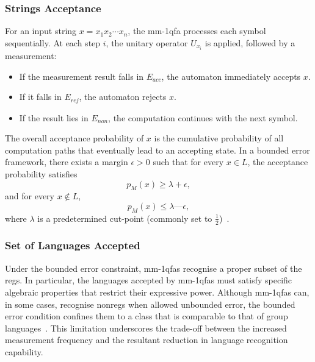 \subsubsection{Strings Acceptance}
For an input string $x=x_1x_2\cdots x_n$, the \gls{mm-1qfa} processes each symbol sequentially. At each step $i$, the unitary operator $U_{x_i}$ is applied, followed by a measurement:
\begin{itemize}
    \item If the measurement result falls in $E_{acc}$, the automaton immediately accepts $x$.
    \item If it falls in $E_{rej}$, the automaton rejects $x$.
    \item If the result lies in $E_{non}$, the computation continues with the next symbol.
\end{itemize}
The overall acceptance probability of $x$ is the cumulative probability of all computation paths that eventually lead to an accepting state. In a bounded error framework, there exists a margin $\epsilon > 0$ such that for every $x\in L$, the acceptance probability satisfies
\[
p_M(x) \ge \lambda + \epsilon,
\]
and for every $x\notin L$, 
\[
p_M(x) \le \lambda—\epsilon,
\]
where $\lambda$ is a predetermined cut-point (commonly set to $\frac{1}{2}$)~\cite{kondacs1997power,brodsky2002characterizations}.

\subsubsection{Set of Languages Accepted}
Under the bounded error constraint, \glspl{mm-1qfa} recognise a proper subset of the \glspl{reg}. In particular, the languages accepted by \glspl{mm-1qfa} must satisfy specific algebraic properties that restrict their expressive power. Although \glspl{mm-1qfa} can, in some cases, recognise non\glspl{reg} when allowed unbounded error, the bounded error condition confines them to a class that is comparable to that of group languages~\cite{brodsky2002characterizations,kondacs1997power}. This limitation underscores the trade-off between the increased measurement frequency and the resultant reduction in language recognition capability.

